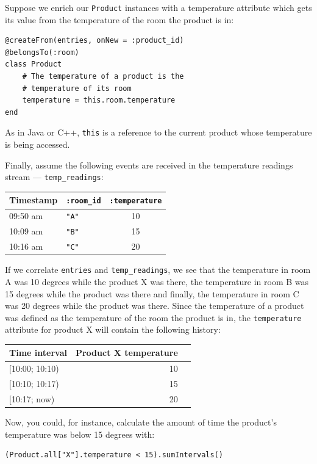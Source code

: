 \documentclass{report}
\begin{document}
Suppose we enrich our \verb=Product= instances with a temperature
attribute which gets its value from the temperature of the room the
product is in:


\begin{verbatim}
@createFrom(entries, onNew = :product_id)
@belongsTo(:room)
class Product
    # The temperature of a product is the
    # temperature of its room
    temperature = this.room.temperature
end
\end{verbatim}

As in Java or C++, \verb=this= is a reference to the current product
whose temperature is being accessed.

Finally, assume the following events are received in the temperature
readings stream --- \verb=temp_readings=:

\begin{tabular}{ |l|l|c| }
  \hline
  Timestamp & \verb=:room_id= & \verb=:temperature= \\
  \hline
  09:50 am & \verb="A"= & 10 \\
  10:09 am & \verb="B"= & 15 \\
  10:16 am & \verb="C"= & 20 \\
  \hline
\end{tabular}

If we correlate \verb=entries= and \verb=temp_readings=, we see that
the temperature in room A was 10 degrees while the product X was
there, the temperature in room B was 15 degrees while the product was
there and finally, the temperature in room C was 20 degrees while the
product was there. Since the temperature of a product was defined as
the temperature of the room the product is in, the \verb=temperature=
attribute for product X will contain the following history:

\begin{tabular}{ |l|r|r| }
  \hline
 Time interval & Product X temperature \\
  \hline
  $[$10:00; 10:10) & 10 \\
  $[$10:10; 10:17) & 15 \\
  $[$10:17;   now) & 20 \\
  \hline
\end{tabular}

Now, you could, for instance, calculate the amount of time the
product's temperature was below 15 degrees with:

\begin{verbatim}
(Product.all["X"].temperature < 15).sumIntervals()
\end{verbatim}
\end{document}

